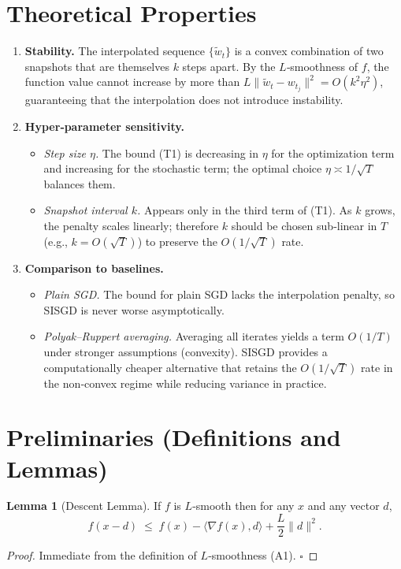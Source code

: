 \documentclass{article}
\theoremstyle{definition}
\newtheorem{lemma}{Lemma}
\begin{document}
\section*{Theoretical Properties}
\begin{enumerate}[leftmargin=*,label={\bf P\arabic*:},nosep]
\item \textbf{Stability.} The interpolated sequence $\{\tilde w_t\}$ is a convex
combination of two snapshots that are themselves $k$ steps apart.  By the
$L$‑smoothness of $f$, the function value cannot increase by more than
$L\|\tilde w_t-w_{t_j}\|^{2}=O(k^{2}\eta^{2})$, guaranteeing that the
interpolation does not introduce instability.
\item \textbf{Hyper‑parameter sensitivity.}
\begin{itemize}[nosep]
\item \emph{Step size $\eta$.} The bound (T1) is decreasing in $\eta$ for the
optimization term and increasing for the stochastic term; the optimal
choice $\eta\asymp 1/\sqrt{T}$ balances them.
\item \emph{Snapshot interval $k$.} Appears only in the third term of (T1).  As
$k$ grows, the penalty scales linearly; therefore $k$ should be chosen
sub‑linear in $T$ (e.g., $k=O(\sqrt{T})$) to preserve the $O(1/\sqrt{T})$
rate.
\end{itemize}
\item \textbf{Comparison to baselines.}
\begin{itemize}[nosep]
\item \emph{Plain SGD.} The bound for plain SGD lacks the interpolation penalty,
so SISGD is never worse asymptotically.
\item \emph{Polyak–Ruppert averaging.} Averaging all iterates yields a term
$O(1/T)$ under stronger assumptions (convexity).  SISGD provides a
computationally cheaper alternative that retains the $O(1/\sqrt{T})$ rate in the
non‑convex regime while reducing variance in practice.
\end{itemize}
\end{enumerate}

\section*{Preliminaries (Definitions and Lemmas)}
\begin{lemma}[Descent Lemma]\label{lem:descent}
If $f$ is $L$‑smooth then for any $x$ and any vector $d$,
\[
f(x-d)\;\le\; f(x)-\langle\nabla f(x),d\rangle+\frac{L}{2}\|d\|^{2}.
\tag{L1}
\]
\end{lemma}
\begin{proof}
Immediate from the definition of $L$‑smoothness (A1). \hfill $\square$
\end{proof}
\end{document}
